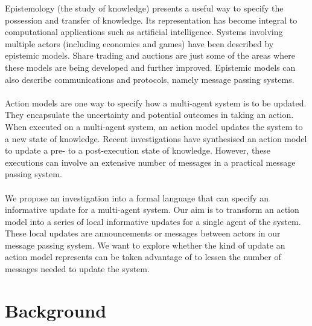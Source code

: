 \documentclass[12pt, a4paper]{article}
\begin{document}
Epistemology (the study of knowledge) presents a useful way to specify the possession and transfer of knowledge.
Its representation has become integral to computational applications such as artificial intelligence.
Systems involving multiple actors (including economics and games) have been described by epistemic models.
Share trading and auctions are just some of the areas where these models are being developed and further improved.
Epistemic models can also describe communications and protocols, namely message passing systems.\\
\\
Action models are one way to specify how a multi-agent system is to be updated.
They encapsulate the uncertainty and potential outcomes in taking an action.
When executed on a multi-agent system, an action model updates the system to a new state of knowledge.
Recent investigations have synthesised an action model to update a pre- to a post-execution state of knowledge.
However, these executions can involve an extensive number of messages in a practical message passing system.\\
\\
We propose an investigation into a formal language that can specify an informative update for a multi-agent system.
Our aim is to transform an action model into a series of local informative updates for a single agent of the system.
These local updates are announcements or messages between actors in our message passing system.
We want to explore whether the kind of update an action model represents can be taken advantage of to lessen the number of messages needed to update the system.
%

\section*{Background}
\end{document}
